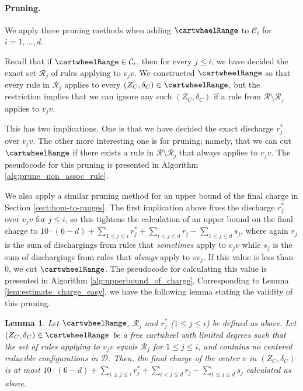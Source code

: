 \documentclass[10pt,a4paper]{article}
\newtheorem{lem}[thm]{Lemma}
\def\cR{{\mathcal R}}
\begin{document}
\paragraph{Pruning.}

We apply three pruning methods when adding $\cartwheelRange$ to $\mathcal{C}_i$ for $i=1,\ldots,d$.

Recall that if $\cartwheelRange \in \mathcal{C}_{i}$, then for every $j\leq i$, we have decided the exact set $\cR_j$ of rules applying to $v_jv$. We constructed 
$\cartwheelRange$ so that every
rule in $\cR_j$ applies
to every 
$(Z_C,\delta_C)\in\cartwheelRange$, but the restriction
implies that we can ignore any
such $(Z_C,\delta_C)$ if a rule from $\cR\setminus\cR_j$ applies
to $v_jv$.

This has two implications. One is that we have decided the exact discharge $r^*_j$ over $v_jv$. The other more interesting one is for pruning; namely, that we can 
cut $\cartwheelRange$ if there exists a rule in $\mathcal{R} \setminus \mathcal{R}_j$ that always applies to $v_jv$.
The pseudocode for this pruning is presented in Algorithm \ref{alg:prune_non_assoc_rule}.

We also apply a similar pruning method for an upper bound of the final charge in Section \ref{sect:hom-to-ranges}.
The first implication above fixes the discharge $r^*_j$ over $v_jv$ for $j\leq i$, so this tightens the calculation of an upper bound on the final charge to $10 \cdot (6-d) + \sum_{1 \leq j \leq i} r_j^* + \sum_{i < j \leq d} r_j - \sum_{1 \leq j \leq d} s_j$, where again $r_j$ is the sum of dischargings from rules that \emph{sometimes} apply to $v_jv$ while $s_j$ is the sum of dischargings from rules that \emph{always} apply to $vv_j$.
If this value is less than $0$, we cut $\cartwheelRange$.
The pseudocode for calculating this value is presented in Algorithm \ref{alg:upperbound_of_charge}.
Corresponding to Lemma
\ref{lem:estimate_charge_easy}, we have the following lemma stating the validity of this pruning.

\begin{lem}
\label{lem:estimate_charge}
    Let $\cartwheelRange$, $\mathcal{R}_j$ and $r^*_j$ ($1 \leq j \leq i$) be defined as above.
    Let $(Z_C, \delta_C) \in \cartwheelRange$ be a free cartwheel with limited degrees such that the set of rules applying to $v_jv$ equals $\mathcal{R}_j$ for $1 \leq j \leq i$, and contains no centered reducible configurations in $\mathcal{D}$.
    Then, the final charge of the center $v$ in $(Z_C, \delta_C)$ is at most $10 \cdot (6-d) + \sum_{1 \leq j \leq i} r_j^* + \sum_{i < j \leq d} r_j - \sum_{1 \leq j \leq d} s_j$ calculated as above.
\end{lem}
\end{document}
